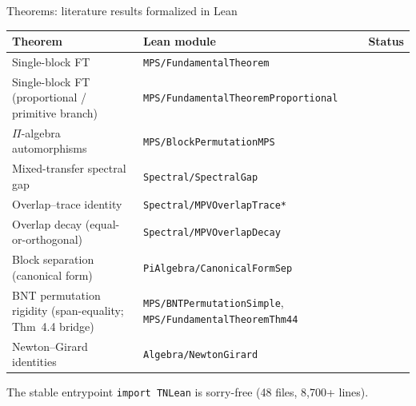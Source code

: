 \documentclass[aspectratio=169,10pt]{beamer}
\begin{document}
\begin{frame}{Theorems: literature results formalized in Lean}
    \vspace{-0.7em}

    \renewcommand{\arraystretch}{1.15}
    \begin{tabular}{p{} p{} p{}}
        \toprule
        \textbf{Theorem} & \textbf{Lean module}                & \textbf{Status} \\
        \midrule
        \rowcolor{cardbg}
        Single-block FT~\cite{Perez-Garcia2007Matrix}
                         & \texttt{MPS/FundamentalTheorem}     & \proved{}       \\
        \rowcolor{cardbg}
        Single-block FT (proportional / primitive branch)~\cite{Cirac2021Matrix}
                         & \texttt{MPS/FundamentalTheoremProportional} & \proved{}  \\
        \rowcolor{cardbg}
        $\Pi$-algebra automorphisms~\cite{Cirac2017Annals}
                         & \texttt{MPS/BlockPermutationMPS}    & \proved{}       \\
        \rowcolor{cardbg}
        Mixed-transfer spectral gap~\cite{Evans1978Spectral,Wolf2012Quantum}
                         & \texttt{Spectral/SpectralGap}       & \proved{}       \\
        \rowcolor{cardbg}
        Overlap--trace identity
                         & \texttt{Spectral/MPVOverlapTrace*}  & \proved{}       \\
        \rowcolor{cardbg}
        Overlap decay (equal-or-orthogonal)
                         & \texttt{Spectral/MPVOverlapDecay}   & \proved{}       \\
        \rowcolor{cardbg}
        Block separation (canonical form)~\cite{Cirac2017Annals,Cirac2021Matrix}
                         & \texttt{PiAlgebra/CanonicalFormSep} & \proved{}       \\
        \rowcolor{cardbg}
        BNT permutation rigidity (span-equality; Thm~4.4 bridge)~\cite{Cirac2021Matrix}
                         & \texttt{MPS/BNTPermutationSimple},
                           \texttt{MPS/FundamentalTheoremThm44}
                         & \proved{}                           \\
        \rowcolor{cardbg}
        Newton--Girard identities
                         & \texttt{Algebra/NewtonGirard}       & \proved{}       \\
        \bottomrule
    \end{tabular}

    \vspace{0.3em}
    \textcolor{dimwhite}{\footnotesize The stable entrypoint \texttt{import TNLean} is sorry-free (48 files, 8{,}700+ lines).}
\end{frame}
\end{document}
